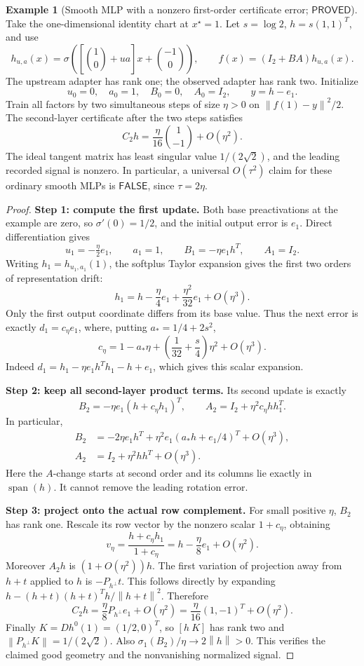 \documentclass[12pt,a4paper]{article}
\theoremstyle{readable}
\theoremstyle{definition}\newtheorem{example}[theorem]{Example}
\newcommand{\Span}{\operatorname{span}}\newcommand{\diag}{\operatorname{diag}}
\newcommand{\norm}[1]{\left\|#1\right\|}
\newcommand{\PP}{\mathsf{PROVED}}\newcommand{\FF}{\mathsf{FALSE}}
\begin{document}
\begin{example}[Smooth MLP with a nonzero first-order certificate error; \(\PP\)]\label{ex:softplus}
Take the one-dimensional identity chart at \(x^\star=1\). Let \(s=\log2\), \(h=s(1,1)^T\), and use
\[
h_{u,a}(x)=\sigma\left(\left[\binom10+ua\right]x+\binom{-1}0\right),
\qquad f(x)=(I_2+BA)h_{u,a}(x).
\]
The upstream adapter has rank one; the observed adapter has rank two. Initialize
\[
u_0=0,\quad a_0=1,\quad B_0=0,\quad A_0=I_2,
\qquad y=h-e_1.
\]
Train all factors by two simultaneous steps of size \(\eta>0\) on \(\norm{f(1)-y}^2/2\). The second-layer certificate after the two steps satisfies
\[
C_2h=\frac{\eta}{16}\binom1{-1}+O(\eta^2).
\]
The ideal tangent matrix has least singular value \(1/(2\sqrt2)\), and the leading recorded signal is nonzero. In particular, a universal \(O(\tau^2)\) claim for these ordinary smooth MLPs is \(\FF\), since \(\tau=2\eta\).
\end{example}
\begin{proof}
\textbf{Step 1: compute the first update.} Both base preactivations at the example are zero, so \(\sigma'(0)=1/2\), and the initial output error is \(e_1\). Direct differentiation gives
\[
u_1=-\tfrac\eta2e_1,\qquad a_1=1,\qquad
B_1=-\eta e_1h^T,\qquad A_1=I_2.
\]
Writing \(h_1=h_{u_1,a_1}(1)\), the softplus Taylor expansion gives the first two orders of representation drift:
\[
h_1=h-\frac\eta4e_1+\frac{\eta^2}{32}e_1+O(\eta^3).
\]
Only the first output coordinate differs from its base value. Thus the next error is exactly \(d_1=c_\eta e_1\), where, putting \(a_*=1/4+2s^2\),
\[
c_\eta=1-a_*\eta+\left(\frac1{32}+\frac s4\right)\eta^2+O(\eta^3).
\]
Indeed \(d_1=h_1-\eta e_1h^Th_1-h+e_1\), which gives this scalar expansion.

\textbf{Step 2: keep all second-layer product terms.} Its second update is exactly
\[
B_2=-\eta e_1(h+c_\eta h_1)^T,
\qquad A_2=I_2+\eta^2c_\eta h h_1^T.
\]
In particular,
\begin{align*}
B_2&=-2\eta e_1h^T+
\eta^2e_1(a_*h+e_1/4)^T+O(\eta^3),\\
A_2&=I_2+\eta^2hh^T+O(\eta^3).
\end{align*}
Here the \(A\)-change starts at second order and its columns lie exactly in \(\Span(h)\). It cannot remove the leading rotation error.

\textbf{Step 3: project onto the actual row complement.} For small positive \(\eta\), \(B_2\) has rank one. Rescale its row vector by the nonzero scalar \(1+c_\eta\), obtaining
\[
v_\eta=\frac{h+c_\eta h_1}{1+c_\eta}
=h-\frac\eta8 e_1+O(\eta^2).
\]
Moreover \(A_2h\) is \((1+O(\eta^2))h\). The first variation of projection away from \(h+t\) applied to \(h\) is \(-P_{h^\perp}t\). This follows directly by expanding
\(h-(h+t)(h+t)^Th/\norm{h+t}^2\).
Therefore
\[
C_2h=\frac\eta8P_{h^\perp}e_1+O(\eta^2)
=\frac\eta{16}(1,-1)^T+O(\eta^2).
\]
Finally \(K=D h^0(1)=(1/2,0)^T\), so \([h\ K]\) has rank two and \(\norm{P_{h^\perp}K}=1/(2\sqrt2)\). Also \(\sigma_1(B_2)/\eta\to2\norm h>0\). This verifies the claimed good geometry and the nonvanishing normalized signal.
\end{proof}
\end{document}

